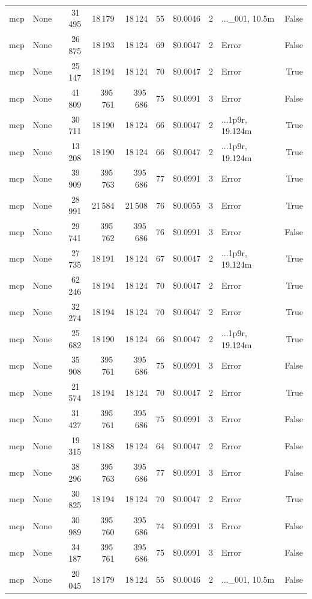 \documentclass[a4paper,11pt]{article}
\begin{document}
\begin{table}[H]
{\begin{tabular}{l r r r r r r r l r}
mcp & None & 31\,495 & 18\,179 & 18\,124 & 55 & \$0.0046 & 2 & ...\_001, 10.5m & False \\
mcp & None & 26\,875 & 18\,193 & 18\,124 & 69 & \$0.0047 & 2 & Error & False \\
mcp & None & 25\,147 & 18\,194 & 18\,124 & 70 & \$0.0047 & 2 & Error & True \\
mcp & None & 41\,809 & 395\,761 & 395\,686 & 75 & \$0.0991 & 3 & Error & False \\
mcp & None & 30\,711 & 18\,190 & 18\,124 & 66 & \$0.0047 & 2 & ...1p9r, 19.124m & True \\
mcp & None & 13\,208 & 18\,190 & 18\,124 & 66 & \$0.0047 & 2 & ...1p9r, 19.124m & True \\
mcp & None & 39\,909 & 395\,763 & 395\,686 & 77 & \$0.0991 & 3 & Error & True \\
mcp & None & 28\,991 & 21\,584 & 21\,508 & 76 & \$0.0055 & 3 & Error & True \\
mcp & None & 29\,741 & 395\,762 & 395\,686 & 76 & \$0.0991 & 3 & Error & False \\
mcp & None & 27\,735 & 18\,191 & 18\,124 & 67 & \$0.0047 & 2 & ...1p9r, 19.124m & True \\
mcp & None & 62\,246 & 18\,194 & 18\,124 & 70 & \$0.0047 & 2 & Error & True \\
mcp & None & 32\,274 & 18\,194 & 18\,124 & 70 & \$0.0047 & 2 & Error & True \\
mcp & None & 25\,682 & 18\,190 & 18\,124 & 66 & \$0.0047 & 2 & ...1p9r, 19.124m & True \\
mcp & None & 35\,908 & 395\,761 & 395\,686 & 75 & \$0.0991 & 3 & Error & False \\
mcp & None & 21\,574 & 18\,194 & 18\,124 & 70 & \$0.0047 & 2 & Error & True \\
mcp & None & 31\,427 & 395\,761 & 395\,686 & 75 & \$0.0991 & 3 & Error & False \\
mcp & None & 19\,315 & 18\,188 & 18\,124 & 64 & \$0.0047 & 2 & Error & False \\
mcp & None & 38\,296 & 395\,763 & 395\,686 & 77 & \$0.0991 & 3 & Error & False \\
mcp & None & 30\,825 & 18\,194 & 18\,124 & 70 & \$0.0047 & 2 & Error & True \\
mcp & None & 30\,989 & 395\,760 & 395\,686 & 74 & \$0.0991 & 3 & Error & False \\
mcp & None & 34\,187 & 395\,761 & 395\,686 & 75 & \$0.0991 & 3 & Error & False \\
mcp & None & 20\,045 & 18\,179 & 18\,124 & 55 & \$0.0046 & 2 & ...\_001, 10.5m & False \\

\end{tabular}}
\end{table}
\end{document}
